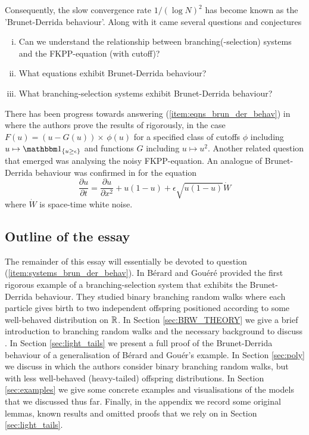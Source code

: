 Consequently, the slow convergence rate $1 / (\log N)^2$ has become known as the 'Brunet-Derrida behaviour'. Along with it came several questions and conjectures
\begin{enumerate}[(i)]
\item \vspace{-2mm}Can we understand the relationship between branching(-selection) systems and the FKPP-equation (with cutoff)? 
\item \vspace{-2mm}What equations exhibit Brunet-Derrida behaviour? \label{item:eqns_brun_der_behav}
\item \vspace{-2mm}What branching-selection systems exhibit Brunet-Derrida behaviour? \label{item:systems_brun_der_behav}
\end{enumerate}{}
There has been progress towards answering (\ref{item:eqns_brun_der_behav}) in \cite{dumortier2007critical} where the authors prove the results of \cite{brunet1997shift} rigorously, in the case $F(u) = (u - G(u)) \times\,\phi(u)$ for a specified class of cutoffs $\phi$ including $u \mapsto \Ind_{\{ u \geq \epsilon\}}$ and functions $G$ including $u \mapsto u^2$. Another related question that emerged was analysing the noisy FKPP-equation. An analogue of Brunet-Derrida behaviour was confirmed in \cite{mueller2011effect} for the equation
\begin{equation}\nonumber
\frac{\partial u}{\partial t} = \frac{\partial u}{\partial x^2} + u(1 - u) + \epsilon \sqrt{u(1 - u)} \dot{W}
\end{equation}
where $\dot{W}$ is space-time white noise. \\


\subsection{Outline of the essay}
The remainder of this essay will essentially be devoted to question (\ref{item:systems_brun_der_behav}). In \cite{exp_tails} Bérard and Gouéré provided the first rigorous example of a branching-selection system that exhibits the Brunet-Derrida behaviour. They studied binary branching random walks where each particle gives birth to two independent offspring positioned according to some well-behaved distribution on $\mathbb{R}$. In Section \ref{sec:BRW_THEORY} we give a brief introduction to branching random walks and the necessary background to discuss \cite{exp_tails}. In Section \ref{sec:light_tails} we present a full proof of the Brunet-Derrida behaviour of a generalisation of Bérard and Gouér's example. In Section \ref{sec:poly} we discuss \cite{poly_tails} in which the authors consider binary branching random walks, but with less well-behaved (heavy-tailed) offspring distributions. In Section \ref{sec:examples} we give some concrete examples and visualisations of the models that we discussed thus far. Finally, in the appendix we record some original lemmas, known results and omitted proofs that we rely on in Section \ref{sec:light_tails}. 

\newpage